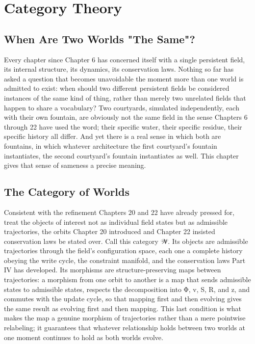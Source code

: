 \chapter{Category Theory}

\section{When Are Two Worlds "The Same"?}

Every chapter since Chapter 6 has concerned itself with a single persistent field, its internal structure, its dynamics, its conservation laws. Nothing so far has asked a question that becomes unavoidable the moment more than one world is admitted to exist: when should two different persistent fields be considered instances of the same kind of thing, rather than merely two unrelated fields that happen to share a vocabulary? Two courtyards, simulated independently, each with their own fountain, are obviously not the same field in the sense Chapters 6 through 22 have used the word; their specific water, their specific residue, their specific history all differ. And yet there is a real sense in which both are fountains, in which whatever architecture the first courtyard's fountain instantiates, the second courtyard's fountain instantiates as well. This chapter gives that sense of sameness a precise meaning.

\section{The Category of Worlds}

Consistent with the refinement Chapters 20 and 22 have already pressed for, treat the objects of interest not as individual field states but as admissible trajectories, the orbits Chapter 20 introduced and Chapter 22 insisted conservation laws be stated over. Call this category 𝒲. Its objects are admissible trajectories through the field's configuration space, each one a complete history obeying the write cycle, the constraint manifold, and the conservation laws Part IV has developed. Its morphisms are structure-preserving maps between trajectories: a morphism from one orbit to another is a map that sends admissible states to admissible states, respects the decomposition into Φ, v, S, R, and z, and commutes with the update cycle, so that mapping first and then evolving gives the same result as evolving first and then mapping. This last condition is what makes the map a genuine morphism of trajectories rather than a mere pointwise relabeling; it guarantees that whatever relationship holds between two worlds at one moment continues to hold as both worlds evolve.

